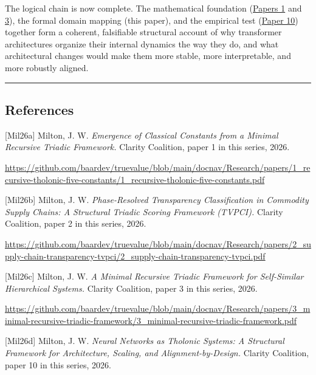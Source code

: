 \documentclass[
  11pt,
  letterpaper,
]{article}
\begin{document}
The logical chain is now complete. The mathematical foundation
(\href{https://github.com/baardev/truevalue/blob/main/docnav/Research/papers/1_recursive-tholonic-five-constants/1_recursive-tholonic-five-constants.pdf}{Papers
1} and
\href{https://github.com/baardev/truevalue/blob/main/docnav/Research/papers/3_minimal-recursive-triadic-framework/3_minimal-recursive-triadic-framework.pdf}{3}),
the formal domain mapping (this paper), and the empirical test
(\href{https://github.com/baardev/truevalue/blob/main/docnav/Research/papers/10_tholonic-neural-architecture/10_tholonic-neural-architecture.pdf}{Paper
10}) together form a coherent, falsifiable structural account of why
transformer architectures organize their internal dynamics the way they
do, and what architectural changes would make them more stable, more
interpretable, and more robustly aligned.

\begin{center}\rule{0.5\linewidth}{0.5pt}\end{center}

\subsection{References}\label{references}

{[}Mil26a{]} Milton, J. W. \emph{Emergence of Classical Constants from a
Minimal Recursive Triadic Framework.} Clarity Coalition, paper 1 in this
series, 2026.

\url{https://github.com/baardev/truevalue/blob/main/docnav/Research/papers/1_recursive-tholonic-five-constants/1_recursive-tholonic-five-constants.pdf}

{[}Mil26b{]} Milton, J. W. \emph{Phase-Resolved Transparency
Classification in Commodity Supply Chains: A Structural Triadic Scoring
Framework (TVPCI).} Clarity Coalition, paper 2 in this series, 2026.

\url{https://github.com/baardev/truevalue/blob/main/docnav/Research/papers/2_supply-chain-transparency-tvpci/2_supply-chain-transparency-tvpci.pdf}

{[}Mil26c{]} Milton, J. W. \emph{A Minimal Recursive Triadic Framework
for Self-Similar Hierarchical Systems.} Clarity Coalition, paper 3 in
this series, 2026.

\url{https://github.com/baardev/truevalue/blob/main/docnav/Research/papers/3_minimal-recursive-triadic-framework/3_minimal-recursive-triadic-framework.pdf}

{[}Mil26d{]} Milton, J. W. \emph{Neural Networks as Tholonic Systems: A
Structural Framework for Architecture, Scaling, and
Alignment-by-Design.} Clarity Coalition, paper 10 in this series, 2026.
\end{document}
